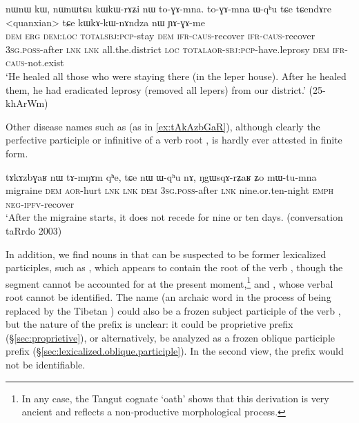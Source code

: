 \begin{exe}
\ex \label{ex:kWkAkWnAndza}
 \gll nɯnɯ kɯ, nɯnɯtɕu kɯ\redp{}kɯ-rɤʑi nɯ to-ɣɤ-mna. to-ɣɤ-mna ɯ-qʰu tɕe tɕendɤre <quanxian> tɕe kɯ\redp{}kɤ-kɯ-nɤndza nɯ ɲɤ-ɣɤ-me \\
 \textsc{dem} \textsc{erg} \textsc{dem}:\textsc{loc} \textsc{total}\redp{}\textsc{sbj}:\textsc{pcp}-stay \textsc{dem} \textsc{ifr}-\textsc{caus}-recover  \textsc{ifr}-\textsc{caus}-recover  \textsc{3sg}.\textsc{poss}-after \textsc{lnk} \textsc{lnk} all.the.district \textsc{loc} \textsc{total}\redp{}\textsc{aor}-\textsc{sbj}:\textsc{pcp}-have.leprosy \textsc{dem} \textsc{ifr}-\textsc{caus}-not.exist \\
\glt `He healed all those who were staying there (in the leper house). After he healed them, he had eradicated leprosy (removed all lepers) from our district.' (25-khArWm) 
\end{exe}

Other disease names such as  (as in \ref{ex:tAkAzbGaR}), although clearly the perfective participle or infinitive of a verb root , is hardly ever attested in finite form.

\begin{exe}
\ex \label{ex:tAkAzbGaR}
 \gll tɤkɤzbɣaʁ nɯ tɤ-mŋɤm qʰe, tɕe nɯ ɯ-qʰu nɤ, ŋgɯsqɤ-rʑaʁ ʑo mɯ-tu-mna \\
 migraine \textsc{dem} \textsc{aor}-hurt \textsc{lnk} \textsc{lnk} \textsc{dem} \textsc{3sg}.\textsc{poss}-after \textsc{lnk} nine.or.ten-night \textsc{emph} \textsc{neg}-\textsc{ipfv}-recover \\
\glt `After the migraine starts, it does not recede for nine or ten days. (conversation taRrdo 2003)
\end{exe}

In addition, we find nouns in  that can be suspected to be former lexicalized participles, such as , which appears to contain the root of the verb   , though the segment  cannot be accounted for at the present moment,\footnote{In any case, the Tangut cognate   `oath' shows that this derivation is very ancient and reflects a non-productive morphological process. } and , whose verbal root cannot be identified. The name  (an archaic word in the process of being replaced by the Tibetan ) could also be a frozen subject participle  of the verb , but the nature of the prefix  is unclear: it could be proprietive prefix (§\ref{sec:proprietive}), or alternatively, be analyzed as a frozen oblique participle prefix (§\ref{sec:lexicalized.oblique.participle}). In the second view, the prefix  would not be identifiable.

